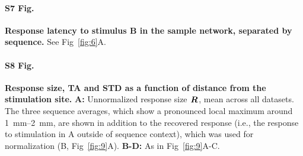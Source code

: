 \documentclass[10pt,letterpaper]{article}
\newcommand{\dev}{\textit{A-as-dev}}
\newcommand{\msc}{\textit{A-in-con}}
\newcommand{\std}{\textit{A-as-std}}
\newcommand{\ifstringequal}[4]{%
  \ifnum\pdfstrcmp{#1}{#2}=0
  #3%
  \else
  #4%
  \fi
}
\newcommand{\seqreplace}[1]{\ifstringequal{dev}{#1}{\dev}{%
    \ifstringequal{std}{#1}{\std}{%
        \ifstringequal{msc}{#1}{\msc}{#1}%
    }%
}}
\newcommand{\R}[3][]{{}^{\seqreplace{#1}}_{}\boldsymbol R^{#2}_{#3}}
\newcommand{\FIG}[1]{Fig~\ref{fig:#1}}
\begin{document}
  \paragraph*{S7 Fig.}
  \label{S7_Fig}
  \textbf{Response latency to stimulus B in the sample network, separated by sequence.}
  See \FIG{6}A.
  
  \paragraph*{S8 Fig.}
  \label{S8_Fig}
  \textbf{Response size, TA and STD as a function of distance from the stimulation site.}
  \textbf{A:} Unnormalized response size $\R{}{}$, mean across all datasets. The three sequence averages, which show a pronounced local maximum around \qtyrange{1}{2}{\milli\meter}, are shown in addition to the recovered response (i.e., the response to stimulation in A outside of sequence context), which was used for normalization (B, \FIG{9}A).
  \textbf{B-D:} As in \FIG{9}A-C.
  
\end{document}
